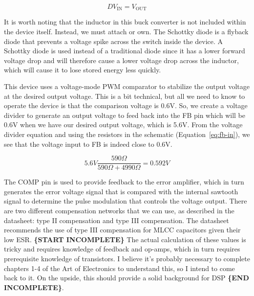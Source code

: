 \documentclass{default}
\begin{document}
\begin{equation} DV_{\text{IN}} = V_{\text{OUT}}
  \label{eq:duty-cycle-eqn}
\end{equation}

It is worth noting that the inductor in this buck converter is not included within the device
itself. Instead, we must attach or own. The Schottky diode is a flyback diode that prevents a
voltage spike across the switch inside the device. A Schottky diode is used instead of a traditional
diode since it has a lower forward voltage drop and will therefore cause a lower voltage drop across
the inductor, which will cause it to lose stored energy less quickly.

This device uses a voltage-mode PWM comparator to stabilize the output voltage at the desired output
voltage. This is a bit technical, but all we need to know to operate the device is that the
comparison voltage is 0.6V. So, we create a voltage divider to generate an output voltage to feed
back into the FB pin which will be 0.6V when we have our desired output voltage, which is 5.6V. From
the voltage divider equation and using the resistors in the schematic (Equation~\ref{eq:fb-in}), we
see that the voltage input to FB is indeed close to 0.6V.

\begin{equation}
  5.6V \frac{590\Omega}{590\Omega + 4990\Omega} = 0.592V \label{eq:fb-in}
\end{equation}

The COMP pin is used to provide feedback to the error amplifier, which in turn generates the error
voltage signal that is compared with the internal sawtooth signal to determine the pulse modulation
that controls the voltage output. There are two different compensation networks that we can use, as
described in the datasheet: type II compensation and type III compensation. The datasheet recommends
the use of type III compensation for MLCC capacitors given their low ESR. \textbf{\{START
  INCOMPLETE\}} The actual calculation of these values is tricky and requires knowledge of feedback
and op-amps, which in turn requires prerequisite knowledge of transistors. I believe it's probably
necessary to complete chapters 1-4 of the Art of Electronics to understand this, so I intend to come
back to it. On the upside, this should provide a solid background for DSP \textbf{\{END
  INCOMPLETE\}}.
\end{document}
